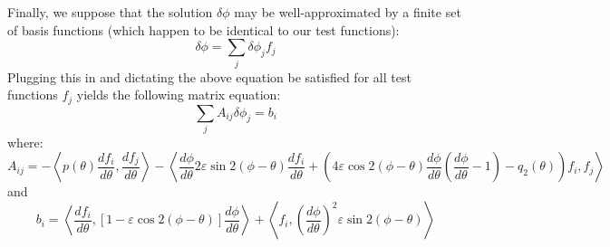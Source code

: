 \documentclass[reqno]{article}
\begin{document}
Finally, we suppose that the solution $\delta \phi$ may be well-approximated by a finite set of basis functions (which happen to be identical to our test functions):
\begin{equation}
    \delta \phi = \sum_{j} \delta \phi_j f_j
\end{equation}
Plugging this in and dictating the above equation be satisfied for all test functions $f_j$ yields the following matrix equation:
\begin{equation}
    \sum_j A_{ij} \delta \phi_j = b_i
\end{equation}
where:
\begin{equation}
    A_{ij}
    =
    - \left< p(\theta) \frac{d f_i}{d\theta}, \frac{d f_j}{d\theta} \right>
    - \left< \frac{d \phi}{d \theta} 2 \varepsilon \sin 2 (\phi - \theta) \frac{d f_i}{d\theta}
        + \left( 4 \varepsilon \cos 2 (\phi - \theta) \frac{d \phi}{d\theta} \left( \frac{d \phi}{d\theta} - 1 \right) - q_2 (\theta) \right) f_i, f_j \right>
\end{equation}
and
\begin{equation}
    b_i
    =
    \left< \frac{d f_i}{d \theta}, \left[1 - \varepsilon \cos 2 (\phi - \theta) \right] \frac{d \phi}{d\theta} \right>
    + \left< f_i, \left( \frac{d \phi}{d\theta} \right)^2 \varepsilon \sin 2 (\phi - \theta) \right>
\end{equation}
\end{document}
